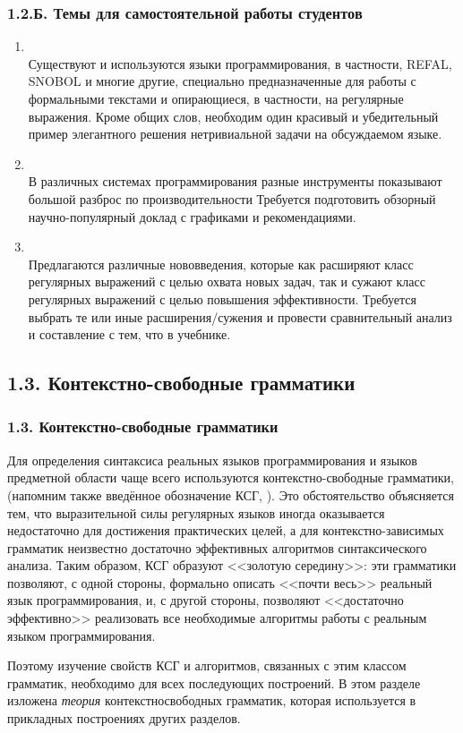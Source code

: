\begin{frame}
\frametitle{1.2.Б. Темы для самостоятельной работы студентов}

\begin{enumerate}
\item  {} \\
Существуют и используются языки программирования, 
в частности, REFAL, SNOBOL и многие другие, специально 
предназначенные для работы с формальными текстами и
опирающиеся, в частности, на регулярные выражения.
Кроме общих слов, необходим один красивый и убедительный пример 
элегантного решения нетривиальной задачи на обсуждаемом языке.   

\item {} \\ 
В различных системах программирования разные инструменты показывают
большой разброс по производительности
Требуется подготовить обзорный научно-попу\-лярный доклад с графиками 
и рекомендациями.

\item {} \\ 
Предлагаются различные нововведения, которые как расширяют класс 
регулярных выражений с целью охвата новых задач,
так и сужают класс регулярных выражений с целью повышения эффективности.
Требуется выбрать те или иные расширения/сужения
и провести сравнительный анализ и составление с тем, что в учебнике.

\end{enumerate}

\end{frame}



\subsection{1.3. Контекстно-свободные грамматики}\label{1.3.}
\begin{frame}
\frametitle{1.3. Контекстно-свободные грамматики}

Для определения синтаксиса реальных
языков программирования и 
языков предметной области 
чаще всего используются
контекстно-свободные грамматики, (напомним
также введённое обозначение КСГ, ). 
Это обстоятельство объясняется тем,
что выразительной силы регулярных языков иногда оказывается
недостаточно для достижения 
практических целей, а для 
контекстно-зависимых грамматик 
неизвестно достаточно эффективных алгоритмов 
синтаксического анализа.
Таким образом,
КСГ образуют <<золотую середину>>:
эти грамматики позволяют, 
с одной стороны,
формально описать <<почти весь>> 
реальный язык программирования,
и, с другой стороны,
позволяют <<достаточно эффективно>>
реализовать все необходимые 
алгоритмы работы с реальным языком программирования.

\medskip  
Поэтому изучение свойств КСГ 
и алгоритмов, связанных с этим
классом грамматик, необходимо 
для всех последующих построений. 
В этом разделе изложена {\em теория}
 контекстно\-свободных грамматик, 
которая используется в прикладных 
построениях других разделов. 
\end{frame}

